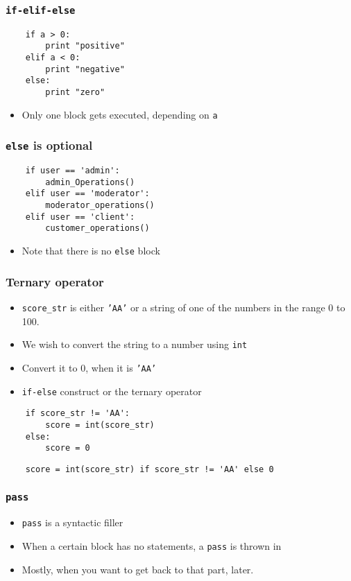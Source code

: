 \begin{frame}[fragile]
  \frametitle{\texttt{if-elif-else}}
  \begin{lstlisting}
    if a > 0:           
        print "positive"
    elif a < 0:         
        print "negative"
    else:               
        print "zero"    
  \end{lstlisting}
  \begin{itemize}
  \item Only one block gets executed, depending on \texttt{a}
  \end{itemize}
\end{frame}

\begin{frame}[fragile]
  \frametitle{\texttt{else} is optional}
  \begin{lstlisting}
    if user == 'admin':         
        admin_Operations()
    elif user == 'moderator':   
        moderator_operations()
    elif user == 'client':      
        customer_operations()
  \end{lstlisting}
  \begin{itemize}
  \item Note that there is no \texttt{else} block
  \end{itemize}
\end{frame}

\begin{frame}[fragile]
  \frametitle{Ternary operator}
  \begin{itemize}
  \item \texttt{score\_str} is either \texttt{'AA'} or a string of one
    of the numbers in the range 0 to 100. 
  \item We wish to convert the string to a number using \texttt{int}
  \item Convert it to 0, when it is \texttt{'AA'}
  \item \texttt{if-else} construct or the ternary operator
  \end{itemize}
  \begin{lstlisting}
    if score_str != 'AA':
        score = int(score_str)
    else:
        score = 0
  \end{lstlisting}
  \begin{lstlisting}
    score = int(score_str) if score_str != 'AA' else 0
  \end{lstlisting}
\end{frame}


\begin{frame}[fragile]
  \frametitle{\texttt{pass}}
  \begin{itemize}
  \item \texttt{pass} is a syntactic filler
  \item When a certain block has no statements, a \texttt{pass} is
    thrown in
  \item Mostly, when you want to get back to that part, later.
  \end{itemize}
\end{frame}

